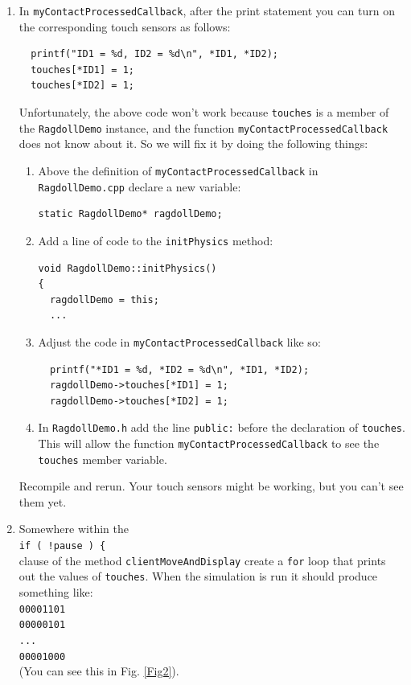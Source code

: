 \documentclass[12pt]{article}
\begin{document}
\begin{enumerate}
\item In \texttt{myContactProcessedCallback}, after the print statement you can turn on the corresponding touch sensors as follows:
\begin{verbatim}
  printf("ID1 = %d, ID2 = %d\n", *ID1, *ID2);
  touches[*ID1] = 1;
  touches[*ID2] = 1;
\end{verbatim}
Unfortunately, the above code won't work because \verb|touches| is a member of the \verb|RagdollDemo| instance, and the function \verb|myContactProcessedCallback| does not know about it.  So we will fix it by doing the following things:
\begin{enumerate}
  \item Above the definition of \verb|myContactProcessedCallback| in \verb|RagdollDemo.cpp| declare a new variable:
    \begin{verbatim}
static RagdollDemo* ragdollDemo;
    \end{verbatim}
  \item Add a line of code to the \verb|initPhysics| method:
\begin{verbatim}
void RagdollDemo::initPhysics()
{
  ragdollDemo = this;
  ...
\end{verbatim}
  \item Adjust the code in \verb|myContactProcessedCallback| like so:
\begin{verbatim}
  printf("*ID1 = %d, *ID2 = %d\n", *ID1, *ID2);
  ragdollDemo->touches[*ID1] = 1;
  ragdollDemo->touches[*ID2] = 1;
\end{verbatim}
\item In \verb|RagdollDemo.h| add the line \verb|public:| before the declaration of \verb|touches|. This will allow the function \verb|myContactProcessedCallback| to see the \verb|touches| member variable.
\end{enumerate}
Recompile and rerun.  Your touch sensors might be working, but you can't see them yet.

\item Somewhere within the \\
    \texttt{if ( !pause ) \{}\\
    clause of the method \texttt{clientMoveAndDisplay} create a \texttt{for} loop that prints out the values of \texttt{touches}. When the simulation is run it should produce something like: \\
    \texttt{00001101}\\
    \texttt{00000101}\\
    \texttt{...}\\
    \texttt{00001000}\\
    (You can see this in Fig. \ref{Fig2}).


\end{enumerate}
\end{document}
